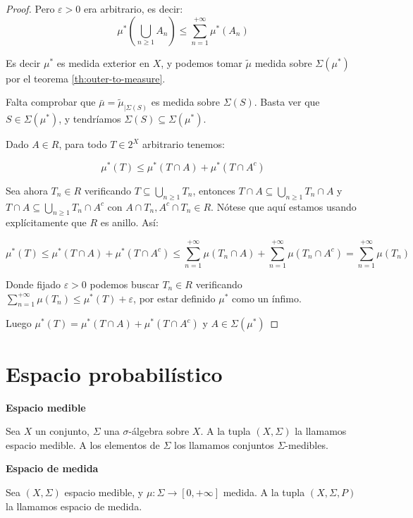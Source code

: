 \begin{proof}
 Pero $\varepsilon > 0$ era arbitrario, es decir: 
 \[\mu^\ast \left(\bigcup_{n\ge 1} A_n \right) \le \sum_{n=1}^{+\infty}\mu^\ast(A_n)\]
 
 Es decir $\mu^\ast$ es medida exterior en $X$, y podemos tomar $\widetilde{\mu}$ medida sobre $\Sigma(\mu^\ast)$ por
 el teorema \ref{th:outer-to-measure}.
 
 Falta comprobar que $\bar{\mu} = \widetilde{\mu}_{|\Sigma(S)}$ es medida sobre $\Sigma(S)$. Basta ver que $S\in \Sigma(\mu^\ast)$,
 y tendríamos $\Sigma(S) \subseteq \Sigma(\mu^\ast)$.
 
 Dado $A\in R$, para todo $T\in 2^X$ arbitrario tenemos:
 
 \[\mu^\ast(T) \le \mu^\ast(T\cap A) + \mu^\ast(T\cap A^c)\]
 
 Sea ahora $T_n \in R$ verificando $T\subseteq \bigcup_{n\ge 1} T_n$, entonces 
 $T\cap A \subseteq \bigcup_{n\ge 1} T_n \cap A$ y $T\cap A \subseteq \bigcup_{n\ge 1} T_n \cap A^c$ con 
 $A\cap T_n, A^c \cap T_n \in R$. Nótese que aquí estamos usando explícitamente que $R$ es anillo. Así:
 
 \[\mu^\ast(T) \le \mu^\ast(T\cap A) + \mu^\ast(T\cap A^c) \le \sum_{n=1}^{+\infty}\mu(T_n \cap A) + 
 \sum_{n=1}^{+\infty} \mu(T_n \cap A^c) = \sum_{n=1}^{+\infty} \mu(T_n)\]
 
 Donde fijado $\varepsilon > 0$ podemos buscar $T_n \in R$ verificando $\sum_{n=1}^{+\infty} \mu(T_n) \le \mu^\ast(T) + \varepsilon$, 
 por estar definido $\mu^\ast$ como un ínfimo.
 
 Luego $\mu^\ast(T) = \mu^\ast(T\cap A) + \mu^\ast(T\cap A^c)$ y $A\in \Sigma(\mu^\ast)$
\end{proof}



\section{Espacio probabilístico}

\begin{definition} \textbf{Espacio medible}

 Sea $X$ un conjunto, $\Sigma$ una $\sigma$-álgebra sobre $X$. A la tupla $(X,\Sigma)$ la llamamos
 espacio medible. A los elementos de $\Sigma$ los llamamos conjuntos $\Sigma$-medibles.
\end{definition}


\begin{definition} \textbf{Espacio de medida}

 Sea $(X, \Sigma)$ espacio medible, y $\mu: \Sigma \rightarrow [0,+\infty]$ medida. A la tupla $(X, \Sigma, P)$ 
 la llamamos espacio de medida.
\end{definition}


